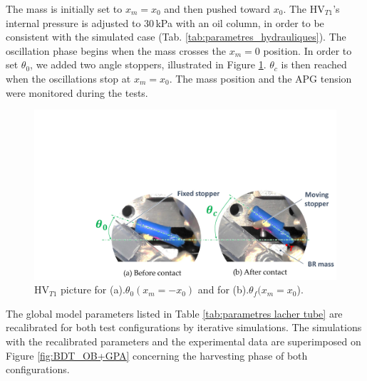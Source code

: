 \documentclass[3p,twocolumn,preprint]{elsarticle}
\begin{document}
The mass is initially set to $x_m=x_0$ and then pushed toward $x_0$. The HV$_{T1}$'s internal pressure is adjusted to $30$\,kPa with an oil column, in order to be consistent with the simulated case (Tab. \ref{tab:parametres_hydrauliques}). The oscillation phase begins when the mass crosses the $x_m=0$ position. In order to set $\theta_0$, we added two angle stoppers, illustrated in Figure \ref{fig:contact_M_VH_lachers}. $\theta_c$ is then reached when the oscillations stop at $x_m=x_0$. The mass position and the APG tension were monitored during the tests.
\begin{figure}[!htbp]
	\begin{center}
		\captionsetup{justification=centering}
		\includegraphics[trim={6.9cm 0cm 0cm 9cm},clip,width=0.9\linewidth]{figures/contact_M_VH_lachers.pdf}
		\caption{HV$_{T1}$ picture for (a).$\theta_0(x_m=-x_{0})$ and for (b).$\theta_f(x_m=x_0$).}
		\label{fig:contact_M_VH_lachers}
	\end{center}
\end{figure}

The global model parameters listed in Table \ref{tab:parametres lacher tube} are recalibrated for both test configurations by iterative simulations. The simulations with the recalibrated parameters and the experimental data are superimposed on Figure \ref{fig:BDT_OB+GPA} concerning the harvesting phase of both configurations. 
\end{document}
